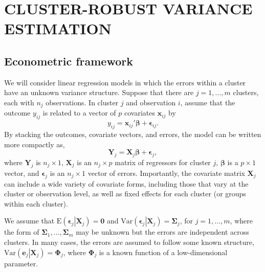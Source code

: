 \documentclass[12pt]{article}\usepackage[]{graphicx}\usepackage[]{color}
\newcommand{\E}{\text{E}}
\newcommand{\Var}{\text{Var}}
\newcommand{\bm}{\mathbf}
\newcommand{\bs}{\boldsymbol}
\begin{document}
\section{CLUSTER-ROBUST VARIANCE ESTIMATION}
\label{sec:CRVE}

\subsection{Econometric framework}

We will consider linear regression models in which the errors within a cluster have an unknown variance structure. 
Suppose that there are $j=1,...,m$ clusters, each with $n_j$ observations. In cluster $j$ and observation $i$, assume that the outcome $y_{ij}$ is related to a vector of $p$ covariates $\bm{x}_{ij}$ by
\begin{equation}
\label{eq:model_vector}
y_{ij} = \bm{x}_{ij}' \bs\beta + \bs\epsilon_{ij}.
\end{equation}
By stacking the outcomes, covariate vectors, and errors, the model can be written more compactly as,
\begin{equation}
\label{eq:model_vector}
\bm{Y}_j = \bm{X}_j \bs\beta + \bs\epsilon_j,
\end{equation}
where $\bm{Y}_j$ is $n_j \times 1$, $\bm{X}_j$ is an $n_j \times p$ matrix of regressors for cluster $j$, $\bs\beta$ is a $p \times 1$ vector, and $\bs\epsilon_j$ is an $n_j \times 1$ vector of errors. 
Importantly, the covariate matrix $\bm{X}_j$ can include a wide variety of covariate forms, including those that vary at the cluster or observation level, as well as fixed effects for each cluster (or groups within each cluster).

We assume that $\E\left(\bs\epsilon_j\left|\bm{X}_j\right.\right) = \bm{0}$ and $\Var\left(\bs\epsilon_j\left|\bm{X}_j\right.\right) = \bs\Sigma_j$, for $j = 1,...,m$, where the form of $\bs\Sigma_1,...,\bs\Sigma_m$ may be unknown but the errors are independent across clusters. 
In many cases, the errors are assumed to follow some known structure, $\Var\left(\bm{e}_j\left|\bm{X}_j\right.\right) = \bs\Phi_j$, where $\bs\Phi_j$ is a known function of a low-dimensional parameter. %

\end{document}

